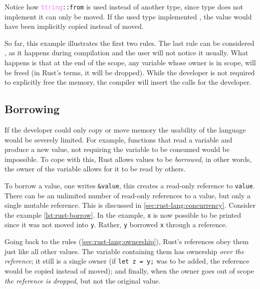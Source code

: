 Notice how \texttt{\textcolor{violet}{String}::from} is used instead of another type,
since  type does not implement  it can only be moved.
If the used type implemented , the value would have been implicitly copied instead of moved.



So far, this example illustrates the first two rules. The last rule can be considered ,
as it happens during compilation and the user will not notice it usually.
What happens is that at the end of the scope, any variable whose owner is in scope,
will be freed (in Rust's terms, it will be dropped).
While the developer is not required to explicitly free the memory, the compiler will insert the calls for the developer.

\subsection{Borrowing}\label{sec:rust-lang:borrowing}

If the developer could only copy or move memory the usability of the language would be severely limited.
For example, functions that read a variable and produce a new value,
not requiring the variable to be consumed would be impossible.
To cope with this, Rust allows values to be \emph{borrowed}, in other words,
the owner of the variable allows for it to be read by others.

To borrow a value, one writes \texttt{\&value}, this creates a read-only reference to \texttt{value}.
There can be an unlimited number of read-only references to a value, but only a single mutable reference.
This is discussed in \autoref{sec:rust-lang:concurrency}. Consider the example \autoref{lst:rust-borrow}.
In the example, \texttt{x} is now possible to be printed since it was not moved into \texttt{y}.
Rather, \texttt{y} borrowed \texttt{x} through a reference.

Going back to the rules (\autoref{sec:rust-lang:ownership}), Rust's references obey them just like all other values.
The variable containing them has ownership \emph{over the reference}; it still is a single owner
(if \texttt{let z = y;} was to be added, the reference would be copied instead of moved);
and finally, when the owner goes out of scope \emph{the reference is dropped}, but not the original value.



